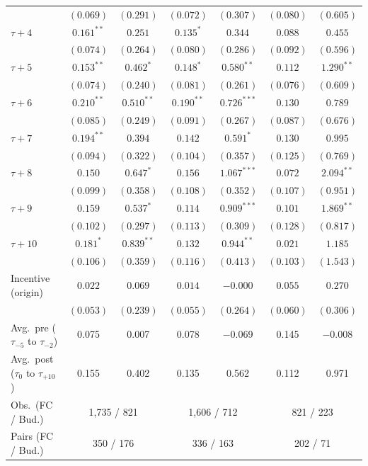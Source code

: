 \begin{table}[htbp]
\begin{tabular}{l cc cc cc }
 & $(0.069)$ & $(0.291)$ & $(0.072)$ & $(0.307)$ & $(0.080)$ & $(0.605)$ \\[2pt]
$\tau+4$ & $0.161^{**}$ & $0.251$ & $0.135^{*}$ & $0.344$ & $0.088$ & $0.455$ \\
 & $(0.074)$ & $(0.264)$ & $(0.080)$ & $(0.286)$ & $(0.092)$ & $(0.596)$ \\[2pt]
$\tau+5$ & $0.153^{**}$ & $0.462^{*}$ & $0.148^{*}$ & $0.580^{**}$ & $0.112$ & $1.290^{**}$ \\
 & $(0.074)$ & $(0.240)$ & $(0.081)$ & $(0.261)$ & $(0.076)$ & $(0.609)$ \\[2pt]
$\tau+6$ & $0.210^{**}$ & $0.510^{**}$ & $0.190^{**}$ & $0.726^{***}$ & $0.130$ & $0.789$ \\
 & $(0.085)$ & $(0.249)$ & $(0.091)$ & $(0.267)$ & $(0.087)$ & $(0.676)$ \\[2pt]
$\tau+7$ & $0.194^{**}$ & $0.394$ & $0.142$ & $0.591^{*}$ & $0.130$ & $0.995$ \\
 & $(0.094)$ & $(0.322)$ & $(0.104)$ & $(0.357)$ & $(0.125)$ & $(0.769)$ \\[2pt]
$\tau+8$ & $0.150$ & $0.647^{*}$ & $0.156$ & $1.067^{***}$ & $0.072$ & $2.094^{**}$ \\
 & $(0.099)$ & $(0.358)$ & $(0.108)$ & $(0.352)$ & $(0.107)$ & $(0.951)$ \\[2pt]
$\tau+9$ & $0.159$ & $0.537^{*}$ & $0.114$ & $0.909^{***}$ & $0.101$ & $1.869^{**}$ \\
 & $(0.102)$ & $(0.297)$ & $(0.113)$ & $(0.309)$ & $(0.128)$ & $(0.817)$ \\[2pt]
$\tau+10$ & $0.181^{*}$ & $0.839^{**}$ & $0.132$ & $0.944^{**}$ & $0.021$ & $1.185$ \\
 & $(0.106)$ & $(0.359)$ & $(0.116)$ & $(0.413)$ & $(0.103)$ & $(1.543)$ \\[2pt]
\midrule
Incentive (origin) & $0.022$ & $0.069$ & $0.014$ & $-0.000$ & $0.055$ & $0.270$ \\
 & $(0.053)$ & $(0.239)$ & $(0.055)$ & $(0.264)$ & $(0.060)$ & $(0.306)$ \\
\midrule
Avg.\ pre ($\tau_{-5}$ to $\tau_{-2}$) & 0.075 & 0.007 & 0.078 & $-$0.069 & 0.145 & $-$0.008 \\
Avg.\ post ($\tau_{0}$ to $\tau_{+10}$) & 0.155 & 0.402 & 0.135 & 0.562 & 0.112 & 0.971 \\
Obs.\ (FC / Bud.) & \multicolumn{2}{c}{1,735 / 821} & \multicolumn{2}{c}{1,606 / 712} & \multicolumn{2}{c}{821 / 223} \\
Pairs (FC / Bud.) & \multicolumn{2}{c}{350 / 176} & \multicolumn{2}{c}{336 / 163} & \multicolumn{2}{c}{202 / 71} \\

\end{tabular}
\end{table}
